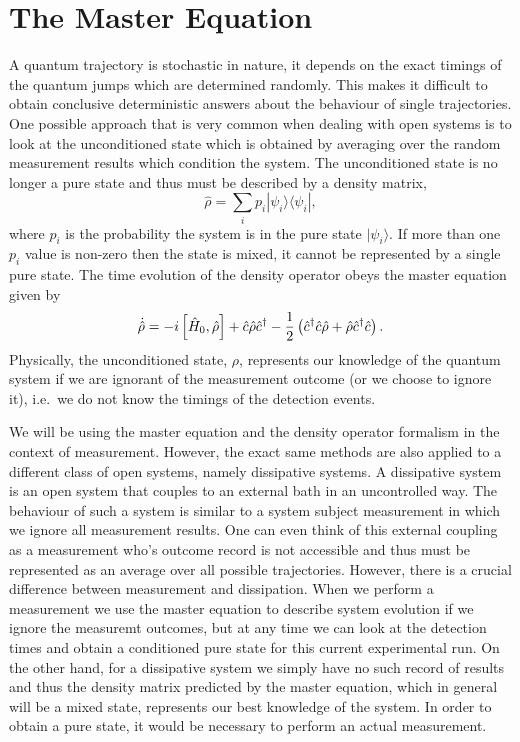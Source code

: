 
\section{The Master Equation}

A quantum trajectory is stochastic in nature, it depends on the exact
timings of the quantum jumps which are determined randomly. This makes
it difficult to obtain conclusive deterministic answers about the
behaviour of single trajectories. One possible approach that is very
common when dealing with open systems is to look at the unconditioned
state which is obtained by averaging over the random measurement
results which condition the system. The unconditioned state is no
longer a pure state and thus must be described by a density matrix,
\begin{equation}
  \label{eq:rho}
  \hat{\rho} = \sum_i p_i | \psi_i \rangle \langle \psi_i |,
\end{equation}
where $p_i$ is the probability the system is in the pure state
$| \psi_i \rangle$. If more than one $p_i$ value is non-zero then the
state is mixed, it cannot be represented by a single pure state. The
time evolution of the density operator obeys the master equation given
by
\begin{equation}
  \dot{\hat{\rho}} = -i \left[ \hat{H}_0, \hat{\rho} \right] + \hat{c}
  \hat{\rho} \hat{c}^\dagger - \frac{1}{2} \left( \hat{c}^\dagger \hat{c} \hat{\rho} + \hat{\rho}
    \hat{c}^\dagger \hat{c} \right).
\end{equation}
Physically, the unconditioned state, $\rho$, represents our knowledge
of the quantum system if we are ignorant of the measurement outcome
(or we choose to ignore it), i.e.~we do not know the timings of the
detection events. 

We will be using the master equation and the density operator
formalism in the context of measurement. However, the exact same
methods are also applied to a different class of open systems, namely
dissipative systems. A dissipative system is an open system that
couples to an external bath in an uncontrolled way. The behaviour of
such a system is similar to a system subject measurement in which we
ignore all measurement results. One can even think of this external
coupling as a measurement who's outcome record is not accessible and
thus must be represented as an average over all possible
trajectories. However, there is a crucial difference between
measurement and dissipation. When we perform a measurement we use the
master equation to describe system evolution if we ignore the
measuremt outcomes, but at any time we can look at the detection times
and obtain a conditioned pure state for this current experimental
run. On the other hand, for a dissipative system we simply have no
such record of results and thus the density matrix predicted by the
master equation, which in general will be a mixed state, represents
our best knowledge of the system. In order to obtain a pure state, it
would be necessary to perform an actual measurement.


